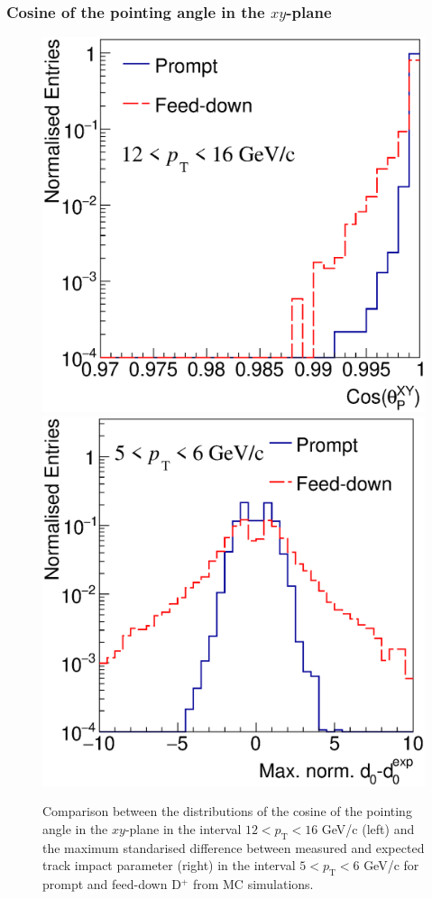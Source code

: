 \documentclass[b5paper,10pt,twoside,oldstyle,classica]{toptesi}
\newcommand{\pt}{p_\text{T}}
\begin{document}
\subsubsection{Cosine of the pointing angle in the $xy$-plane}
\begin{figure}[tb]
\begin{center}
{\includegraphics[scale = 0.3]{CompPromptFD_CospXY_12-16.eps}}
\hspace{0cm}
{\includegraphics[scale = 0.3]{CompPromptFD_d0d0exp_5-6.eps}}
\caption{Comparison between the distributions of the cosine of the pointing angle in the $xy$-plane in the interval $12<\pt<16$ GeV/c (left) and the maximum standarised difference between measured and expected track impact parameter (right) in the interval $5<\pt<6$ GeV/c for prompt and feed-down D$^+$ from MC simulations.}
\label{CospPromptFD}
\end{center}
\end{figure}
\end{document}
